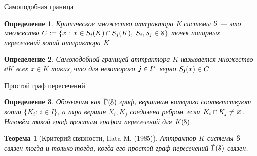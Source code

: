 \documentclass[aspectratio=1610, 10pt, notheorems]{beamer}
\newtheorem{theorem}     {Теорема}
\newtheorem{definition}  {Определение}
\begin{document}
\begin{frame}{}

\end{frame}


\begin{frame}{}

\end{frame}


\begin{frame}{}

\end{frame}


\begin{frame}{}

\end{frame}


\begin{frame}{}

\end{frame}


\begin{frame}{}

\end{frame}


\begin{frame}{Самоподобная граница}
\begin{definition}
{\em Критическое множество} аттрактора $K$ системы ${\EuScript S}$ --- это множество $C:=\{x:\; x\in S_i(K)\cap S_j(K),\; S_i, S_j\in{\EuScript S}\}$ точек попарных пересечений копий аттрактора $K$.
\end{definition}
\begin{definition}
{\em Самоподобной границей} аттрактора $K$ называется множество $\dd K$ всех $x\in K$ таких, что для некоторого ${\bm{j}}\in I^*$ верно $S_{\bm{j}}(x)\in C$.
\end{definition}
\end{frame}


\begin{frame}{Простой граф пересечений}
\begin{definition}
Обозначим как $\tilde{\Gamma}({\EuScript S})$ граф, вершинам которого соответствуют копии $\{K_i:\; i\in I\}$, а пара вершин $K_i,K_j$ соединена ребром, если $K_i\cap K_j\neq\varnothing$.
Назовём такой граф {\em простым графом пересечений} для $K({\EuScript S})$ 
\end{definition}

\begin{theorem}[Критерий связности, Hata M. (1985)]
Аттрактор $K$ системы ${\EuScript S}$ связен тогда и только тогда, когда его простой граф пересечений $\tilde{\Gamma}({\EuScript S})$ связен.
\end{theorem}
\end{frame}
\end{document}
